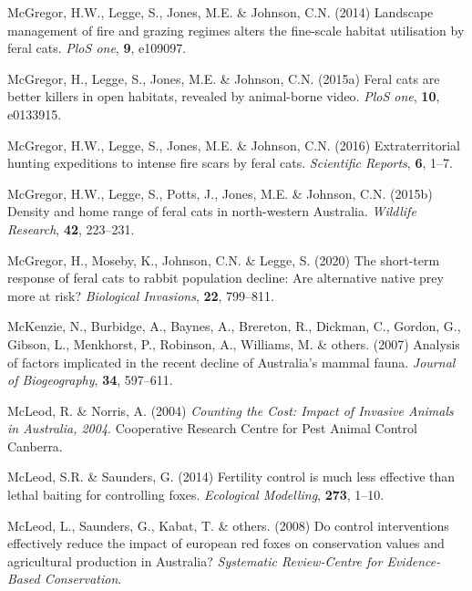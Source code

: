 \documentclass[11pt,a4paper,titlepage,twoside,openright]{style/unimelbthesis}
\begin{document}
\begin{mainmatter}
\leavevmode\hypertarget{ref-mcgregor2014landscape}{}%
McGregor, H.W., Legge, S., Jones, M.E. \& Johnson, C.N. (2014) Landscape management of fire and grazing regimes alters the fine-scale habitat utilisation by feral cats. \emph{PloS one}, \textbf{9}, e109097.

\leavevmode\hypertarget{ref-mcgregor2015feral}{}%
McGregor, H., Legge, S., Jones, M.E. \& Johnson, C.N. (2015a) Feral cats are better killers in open habitats, revealed by animal-borne video. \emph{PloS one}, \textbf{10}, e0133915.

\leavevmode\hypertarget{ref-mcgregor2016extraterritorial}{}%
McGregor, H.W., Legge, S., Jones, M.E. \& Johnson, C.N. (2016) Extraterritorial hunting expeditions to intense fire scars by feral cats. \emph{Scientific Reports}, \textbf{6}, 1--7.

\leavevmode\hypertarget{ref-mcgregor2015density}{}%
McGregor, H.W., Legge, S., Potts, J., Jones, M.E. \& Johnson, C.N. (2015b) Density and home range of feral cats in north-western Australia. \emph{Wildlife Research}, \textbf{42}, 223--231.

\leavevmode\hypertarget{ref-mcgregor2020short}{}%
McGregor, H., Moseby, K., Johnson, C.N. \& Legge, S. (2020) The short-term response of feral cats to rabbit population decline: Are alternative native prey more at risk? \emph{Biological Invasions}, \textbf{22}, 799--811.

\leavevmode\hypertarget{ref-mckenzie2007analysis}{}%
McKenzie, N., Burbidge, A., Baynes, A., Brereton, R., Dickman, C., Gordon, G., Gibson, L., Menkhorst, P., Robinson, A., Williams, M. \& others. (2007) Analysis of factors implicated in the recent decline of Australia's mammal fauna. \emph{Journal of Biogeography}, \textbf{34}, 597--611.

\leavevmode\hypertarget{ref-mcleod2004counting}{}%
McLeod, R. \& Norris, A. (2004) \emph{Counting the Cost: Impact of Invasive Animals in Australia, 2004}. Cooperative Research Centre for Pest Animal Control Canberra.

\leavevmode\hypertarget{ref-mcleod2014fertility}{}%
McLeod, S.R. \& Saunders, G. (2014) Fertility control is much less effective than lethal baiting for controlling foxes. \emph{Ecological Modelling}, \textbf{273}, 1--10.

\leavevmode\hypertarget{ref-mcleod2008control}{}%
McLeod, L., Saunders, G., Kabat, T. \& others. (2008) Do control interventions effectively reduce the impact of european red foxes on conservation values and agricultural production in Australia? \emph{Systematic Review-Centre for Evidence-Based Conservation}.


\end{mainmatter}
\end{document}
